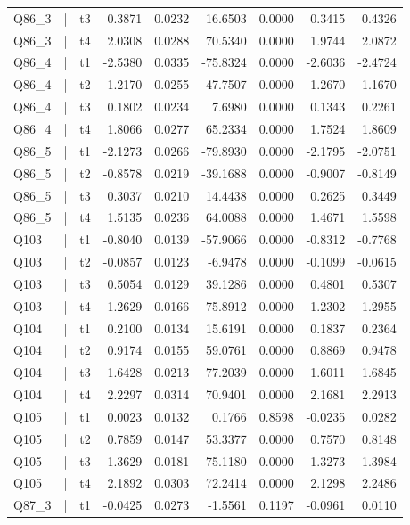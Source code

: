 \begin{longtable}{lllrrrrrr}
Q86\_3 & | & t3 & 0.3871 & 0.0232 & 16.6503 & 0.0000 & 0.3415 & 0.4326\\
Q86\_3 & | & t4 & 2.0308 & 0.0288 & 70.5340 & 0.0000 & 1.9744 & 2.0872\\
Q86\_4 & | & t1 & -2.5380 & 0.0335 & -75.8324 & 0.0000 & -2.6036 & -2.4724\\
\addlinespace
Q86\_4 & | & t2 & -1.2170 & 0.0255 & -47.7507 & 0.0000 & -1.2670 & -1.1670\\
Q86\_4 & | & t3 & 0.1802 & 0.0234 & 7.6980 & 0.0000 & 0.1343 & 0.2261\\
Q86\_4 & | & t4 & 1.8066 & 0.0277 & 65.2334 & 0.0000 & 1.7524 & 1.8609\\
Q86\_5 & | & t1 & -2.1273 & 0.0266 & -79.8930 & 0.0000 & -2.1795 & -2.0751\\
Q86\_5 & | & t2 & -0.8578 & 0.0219 & -39.1688 & 0.0000 & -0.9007 & -0.8149\\
\addlinespace
Q86\_5 & | & t3 & 0.3037 & 0.0210 & 14.4438 & 0.0000 & 0.2625 & 0.3449\\
Q86\_5 & | & t4 & 1.5135 & 0.0236 & 64.0088 & 0.0000 & 1.4671 & 1.5598\\
Q103 & | & t1 & -0.8040 & 0.0139 & -57.9066 & 0.0000 & -0.8312 & -0.7768\\
Q103 & | & t2 & -0.0857 & 0.0123 & -6.9478 & 0.0000 & -0.1099 & -0.0615\\
Q103 & | & t3 & 0.5054 & 0.0129 & 39.1286 & 0.0000 & 0.4801 & 0.5307\\
\addlinespace
Q103 & | & t4 & 1.2629 & 0.0166 & 75.8912 & 0.0000 & 1.2302 & 1.2955\\
Q104 & | & t1 & 0.2100 & 0.0134 & 15.6191 & 0.0000 & 0.1837 & 0.2364\\
Q104 & | & t2 & 0.9174 & 0.0155 & 59.0761 & 0.0000 & 0.8869 & 0.9478\\
Q104 & | & t3 & 1.6428 & 0.0213 & 77.2039 & 0.0000 & 1.6011 & 1.6845\\
Q104 & | & t4 & 2.2297 & 0.0314 & 70.9401 & 0.0000 & 2.1681 & 2.2913\\
\addlinespace
Q105 & | & t1 & 0.0023 & 0.0132 & 0.1766 & 0.8598 & -0.0235 & 0.0282\\
Q105 & | & t2 & 0.7859 & 0.0147 & 53.3377 & 0.0000 & 0.7570 & 0.8148\\
Q105 & | & t3 & 1.3629 & 0.0181 & 75.1180 & 0.0000 & 1.3273 & 1.3984\\
Q105 & | & t4 & 2.1892 & 0.0303 & 72.2414 & 0.0000 & 2.1298 & 2.2486\\
Q87\_3 & | & t1 & -0.0425 & 0.0273 & -1.5561 & 0.1197 & -0.0961 & 0.0110\\

\end{longtable}
